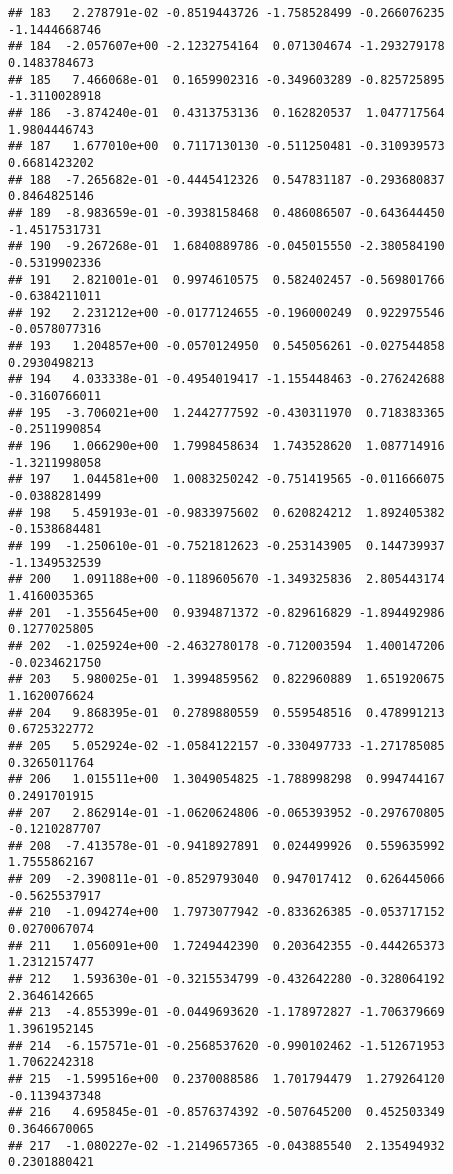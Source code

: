\documentclass[
]{article}
\begin{document}
\begin{verbatim}
## 183   2.278791e-02 -0.8519443726 -1.758528499 -0.266076235 -1.1444668746
## 184  -2.057607e+00 -2.1232754164  0.071304674 -1.293279178  0.1483784673
## 185   7.466068e-01  0.1659902316 -0.349603289 -0.825725895 -1.3110028918
## 186  -3.874240e-01  0.4313753136  0.162820537  1.047717564  1.9804446743
## 187   1.677010e+00  0.7117130130 -0.511250481 -0.310939573  0.6681423202
## 188  -7.265682e-01 -0.4445412326  0.547831187 -0.293680837  0.8464825146
## 189  -8.983659e-01 -0.3938158468  0.486086507 -0.643644450 -1.4517531731
## 190  -9.267268e-01  1.6840889786 -0.045015550 -2.380584190 -0.5319902336
## 191   2.821001e-01  0.9974610575  0.582402457 -0.569801766 -0.6384211011
## 192   2.231212e+00 -0.0177124655 -0.196000249  0.922975546 -0.0578077316
## 193   1.204857e+00 -0.0570124950  0.545056261 -0.027544858  0.2930498213
## 194   4.033338e-01 -0.4954019417 -1.155448463 -0.276242688 -0.3160766011
## 195  -3.706021e+00  1.2442777592 -0.430311970  0.718383365 -0.2511990854
## 196   1.066290e+00  1.7998458634  1.743528620  1.087714916 -1.3211998058
## 197   1.044581e+00  1.0083250242 -0.751419565 -0.011666075 -0.0388281499
## 198   5.459193e-01 -0.9833975602  0.620824212  1.892405382 -0.1538684481
## 199  -1.250610e-01 -0.7521812623 -0.253143905  0.144739937 -1.1349532539
## 200   1.091188e+00 -0.1189605670 -1.349325836  2.805443174  1.4160035365
## 201  -1.355645e+00  0.9394871372 -0.829616829 -1.894492986  0.1277025805
## 202  -1.025924e+00 -2.4632780178 -0.712003594  1.400147206 -0.0234621750
## 203   5.980025e-01  1.3994859562  0.822960889  1.651920675  1.1620076624
## 204   9.868395e-01  0.2789880559  0.559548516  0.478991213  0.6725322772
## 205   5.052924e-02 -1.0584122157 -0.330497733 -1.271785085  0.3265011764
## 206   1.015511e+00  1.3049054825 -1.788998298  0.994744167  0.2491701915
## 207   2.862914e-01 -1.0620624806 -0.065393952 -0.297670805 -0.1210287707
## 208  -7.413578e-01 -0.9418927891  0.024499926  0.559635992  1.7555862167
## 209  -2.390811e-01 -0.8529793040  0.947017412  0.626445066 -0.5625537917
## 210  -1.094274e+00  1.7973077942 -0.833626385 -0.053717152  0.0270067074
## 211   1.056091e+00  1.7249442390  0.203642355 -0.444265373  1.2312157477
## 212   1.593630e-01 -0.3215534799 -0.432642280 -0.328064192  2.3646142665
## 213  -4.855399e-01 -0.0449693620 -1.178972827 -1.706379669  1.3961952145
## 214  -6.157571e-01 -0.2568537620 -0.990102462 -1.512671953  1.7062242318
## 215  -1.599516e+00  0.2370088586  1.701794479  1.279264120 -0.1139437348
## 216   4.695845e-01 -0.8576374392 -0.507645200  0.452503349  0.3646670065
## 217  -1.080227e-02 -1.2149657365 -0.043885540  2.135494932  0.2301880421

\end{verbatim}
\end{document}
